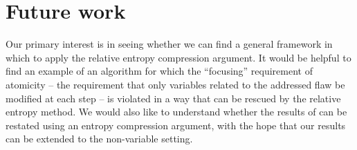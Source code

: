 \documentclass[twocolumn]{article}
\begin{document}
\section{Future work}
Our primary interest is in seeing whether we can find a general framework in which to apply the relative entropy compression argument.
It would be helpful to find an example of an algorithm for which the ``focusing'' requirement of atomicity -- the requirement that only variables related to the addressed flaw be modified at each step -- is violated in a way that can be rescued by the relative entropy method. %
We would also like to understand whether the results of \cite{achlioptas2014random} can be restated using an entropy compression argument, with the hope that our results can be extended to the non-variable setting.
\end{document}
